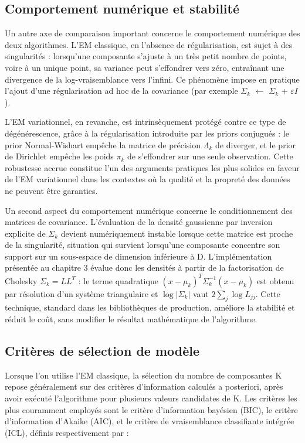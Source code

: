 \subsection{Comportement numérique et stabilité}
Un autre axe de comparaison important concerne le comportement numérique des deux algorithmes. L'EM classique, en l'absence de régularisation, est sujet à des singularités : lorsqu'une composante s'ajuste à un très petit nombre de points, voire à un unique point, sa variance peut s'effondrer vers zéro, entraînant une divergence de la log-vraisemblance vers l'infini. Ce phénomène impose en pratique l'ajout d'une régularisation ad hoc de la covariance (par exemple $\Sigma _{k}$ $\leftarrow $ $\Sigma _{k}$ + $\varepsilon I$).

L'EM variationnel, en revanche, est intrinsèquement protégé contre ce type de dégénérescence, grâce à la régularisation introduite par les priors conjugués : le prior Normal-Wishart empêche la matrice de précision $\Lambda _{k}$ de diverger, et le prior de Dirichlet empêche les poids $\pi _{k}$ de s'effondrer sur une seule observation. Cette robustesse accrue constitue l'un des arguments pratiques les plus solides en faveur de l'EM variationnel dans les contextes où la qualité et la propreté des données ne peuvent être garanties.

Un second aspect du comportement numérique concerne le conditionnement des matrices de covariance. L'évaluation de la densité gaussienne par inversion explicite de $\Sigma _{k}$ devient numériquement instable lorsque cette matrice est proche de la singularité, situation qui survient lorsqu'une composante concentre son support sur un sous-espace de dimension inférieure à D. L'implémentation présentée au chapitre 3 évalue donc les densités à partir de la factorisation de Cholesky $\Sigma _{k} = LL^{T}$ : le terme quadratique $(x-\mu _{k})^{T}\Sigma _{k}^{-1}(x-\mu _{k})$ est obtenu par résolution d'un système triangulaire et $\log |\Sigma _{k}|$ vaut $2\sum _{j}\log L_{jj}$. Cette technique, standard dans les bibliothèques de production, améliore la stabilité et réduit le coût, sans modifier le résultat mathématique de l'algorithme.

\subsection{Critères de sélection de modèle}
Lorsque l'on utilise l'EM classique, la sélection du nombre de composantes K repose généralement sur des critères d'information calculés a posteriori, après avoir exécuté l'algorithme pour plusieurs valeurs candidates de K. Les critères les plus couramment employés sont le critère d'information bayésien (BIC), le critère d'information d'Akaike (AIC), et le critère de vraisemblance classifiante intégrée (ICL), définis respectivement par :

